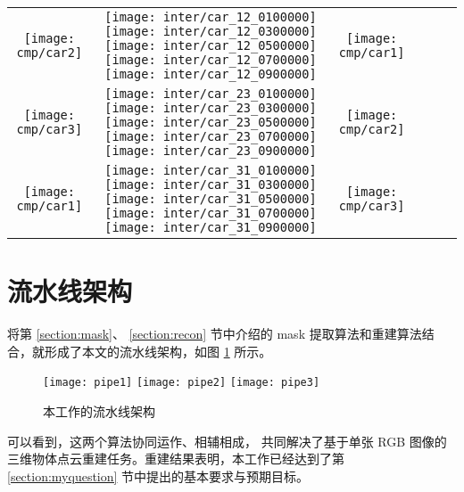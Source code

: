 \begin{longtable}[c]{c*{5}{c}}
	{\texttt{[image: cmp/car2]}}               &
	{\texttt{[image: inter/car\_12\_0100000]}}
		{\texttt{[image: inter/car\_12\_0300000]}}
		{\texttt{[image: inter/car\_12\_0500000]}}
		{\texttt{[image: inter/car\_12\_0700000]}}
	{\texttt{[image: inter/car\_12\_0900000]}}   &
	{\texttt{[image: cmp/car1]}}
	\\
	{\texttt{[image: cmp/car3]}}               &
	{\texttt{[image: inter/car\_23\_0100000]}}
		{\texttt{[image: inter/car\_23\_0300000]}}
		{\texttt{[image: inter/car\_23\_0500000]}}
		{\texttt{[image: inter/car\_23\_0700000]}}
	{\texttt{[image: inter/car\_23\_0900000]}}   &
	{\texttt{[image: cmp/car2]}}
	\\
	{\texttt{[image: cmp/car1]}}               &
	{\texttt{[image: inter/car\_31\_0100000]}}
		{\texttt{[image: inter/car\_31\_0300000]}}
		{\texttt{[image: inter/car\_31\_0500000]}}
		{\texttt{[image: inter/car\_31\_0700000]}}
	{\texttt{[image: inter/car\_31\_0900000]}}   &
	{\texttt{[image: cmp/car3]}}
	\\
	\bottomrule[1.5pt]
\end{longtable}


\section{流水线架构}
将第 \ref{section:mask}、 \ref{section:recon} 节中介绍的 mask 提取算法和重建算法结合，就形成了本文的流水线架构，如图 \ref{fig:mypipeline} 所示。

\begin{figure}[h]
	\centering%
	{\texttt{[image: pipe1]}}%
	\hspace{1em}%
	{\texttt{[image: pipe2]}}
	\hspace{1em}%
	{\texttt{[image: pipe3]}}
	\caption{本工作的流水线架构 \label{fig:mypipeline}}
\end{figure}


可以看到，这两个算法协同运作、相辅相成，
共同解决了基于单张 RGB 图像的
三维物体点云重建任务。重建结果表明，本工作已经达到了第 \ref{section:myquestion} 节中提出的基本要求与预期目标。

